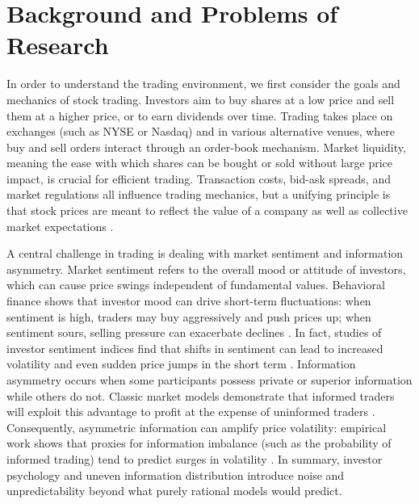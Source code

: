 \section{Background and Problems of Research}
\label{sec:background}
In order to understand the trading environment, we first consider the goals and mechanics of stock trading. Investors aim to buy shares at a low price and sell them at a higher price, or to earn dividends over time. Trading takes place on exchanges (such as NYSE or Nasdaq) and in various alternative venues, where buy and sell orders interact through an order-book mechanism. Market liquidity, meaning the ease with which shares can be bought or sold without large price impact, is crucial for efficient trading. Transaction costs, bid-ask spreads, and market regulations all influence trading mechanics, but a unifying principle is that stock prices are meant to reflect the value of a company as well as collective market expectations \cite{Brealey2022}.

A central challenge in trading is dealing with market sentiment and information asymmetry. Market sentiment refers to the overall mood or attitude of investors, which can cause price swings independent of fundamental values. Behavioral finance shows that investor mood can drive short-term fluctuations: when sentiment is high, traders may buy aggressively and push prices up; when sentiment sours, selling pressure can exacerbate declines \cite{Kahneman2011}. In fact, studies of investor sentiment indices find that shifts in sentiment can lead to increased volatility and even sudden price jumps in the short term \cite{Ung2024}. Information asymmetry occurs when some participants possess private or superior information while others do not. Classic market models demonstrate that informed traders will exploit this advantage to profit at the expense of uninformed traders \cite{Kyle1985}. Consequently, asymmetric information can amplify price volatility: empirical work shows that proxies for information imbalance (such as the probability of informed trading) tend to predict surges in volatility \cite{Watanabe2008}. In summary, investor psychology and uneven information distribution introduce noise and unpredictability beyond what purely rational models would predict.

